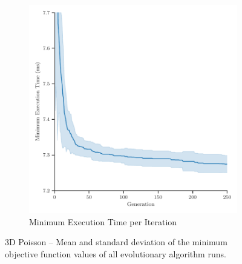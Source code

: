 \begin{figure}
\begin{subfigure}[b]{0.49\textwidth}
		\includegraphics[width=\textwidth]{figures/minimum_execution_time_3D_FD_Poisson_fromL2.pdf}
		\caption{Minimum Execution Time per Iteration}
		\label{fig:poisson-3D-minimum-execution-time}
	\end{subfigure}
	\caption{3D Poisson -- Mean and standard deviation of the minimum objective function values of all evolutionary algorithm runs.}
	\label{fig:poisson-3D-minimum-objectives}
\end{figure}
